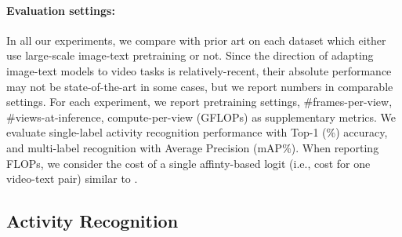 \documentclass[10pt,twocolumn,letterpaper]{article}
\begin{document}
\paragraph{Evaluation settings:} In all our experiments, we compare with prior art on each dataset which either use large-scale image-text pretraining or not. Since the direction of adapting image-text models to video tasks is relatively-recent, their absolute performance may not be state-of-the-art in some cases, but we report numbers in comparable settings. For each experiment, we report pretraining settings, \#frames-per-view, \#views-at-inference, compute-per-view (GFLOPs) as supplementary metrics. We evaluate single-label activity recognition performance with Top-1 (\%) accuracy, and multi-label recognition with Average Precision (mAP\%). When reporting FLOPs, we consider the cost of a single affinty-based logit (i.e., cost for one video-text pair) similar to \cite{ma2022xclip}. 

\subsection{Activity Recognition}
\end{document}
